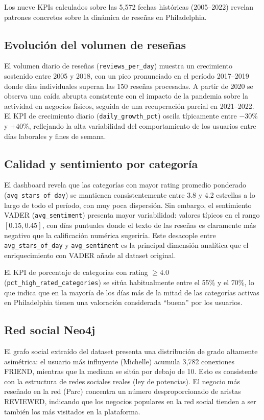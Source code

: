 \documentclass[12pt,a4paper]{article}
\begin{document}
Los nueve KPIs calculados sobre las 5,572 fechas históricas (2005--2022) revelan patrones
concretos sobre la dinámica de reseñas en Philadelphia.

\subsection{Evolución del volumen de reseñas}

El volumen diario de reseñas (\texttt{reviews\_per\_day}) muestra un crecimiento sostenido
entre 2005 y 2018, con un pico pronunciado en el período 2017--2019 donde días individuales
superan las 150 reseñas procesadas. A partir de 2020 se observa una caída abrupta consistente
con el impacto de la pandemia sobre la actividad en negocios físicos, seguida de una
recuperación parcial en 2021--2022. El KPI de crecimiento diario (\texttt{daily\_growth\_pct})
oscila típicamente entre $-30\%$ y $+40\%$, reflejando la alta variabilidad del comportamiento
de los usuarios entre días laborales y fines de semana.

\subsection{Calidad y sentimiento por categoría}

El dashboard revela que las categorías con mayor rating promedio ponderado
(\texttt{avg\_stars\_of\_day}) se mantienen consistentemente entre 3.8 y 4.2 estrellas a lo
largo de todo el período, con muy poca dispersión. Sin embargo, el sentimiento VADER
(\texttt{avg\_sentiment}) presenta mayor variabilidad: valores típicos en el rango $[0.15, 0.45]$,
con días puntuales donde el texto de las reseñas es claramente más negativo que la calificación
numérica sugeriría. Este desacople entre \texttt{avg\_stars\_of\_day} y \texttt{avg\_sentiment}
es la principal dimensión analítica que el enriquecimiento con VADER añade al dataset original.

El KPI de porcentaje de categorías con rating $\geq 4.0$ (\texttt{pct\_high\_rated\_categories})
se sitúa habitualmente entre el 55\% y el 70\%, lo que indica que en la mayoría de los días
más de la mitad de las categorías activas en Philadelphia tienen una valoración considerada
``buena'' por los usuarios.

\subsection{Red social Neo4j}

El grafo social extraído del dataset presenta una distribución de grado altamente asimétrica:
el usuario más influyente (Michelle) acumula 3,782 conexiones FRIEND, mientras que la mediana
se sitúa por debajo de 10. Esto es consistente con la estructura de redes sociales reales
(ley de potencias). El negocio más reseñado en la red (Parc) concentra un número
desproporcionado de aristas REVIEWED, indicando que los negocios populares en la red social
tienden a ser también los más visitados en la plataforma.
\end{document}
